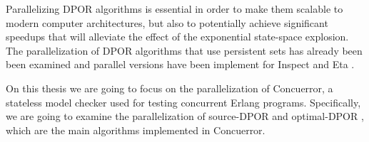 Parallelizing DPOR algorithms is essential in order to make them scalable to modern computer architectures, but also to potentially 
achieve significant speedups that will alleviate the effect of the exponential state-space explosion. The parallelization of
DPOR algorithms that use persistent sets \cite{FlanaganDPOR, Lei:2006:RTC:1248722.1248743, 10.1007/3-540-53863-1_36} has already been 
been examined and parallel versions have been implement for Inspect \cite{Yang:2007:DDP:1770532.1770541} and Eta 
\cite{Simsa2012ScalableDP}.

On this thesis we are going to focus on the parallelization of Concuerror, a stateless model checker
used for testing concurrent Erlang programs. Specifically, we are going to examine the parallelization
of source-DPOR \cite{AbdullaAronisJohnssonSagonasDPOR2014} and optimal-DPOR \cite{AbdullaAronisJohnssonSagonasDPOR2014}, 
which are the main algorithms implemented in Concuerror.




